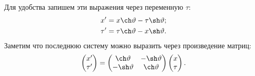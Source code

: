 Для удобства запишем эти выражения через переменную $\tau$:
\begin{align*}
x^{\prime} & =x \ch \vartheta-\tau \sh \vartheta; \\
\tau^{\prime} & =\tau \ch \vartheta-x \sh \vartheta.
\end{align*}
Заметим что последнюю систему можно выразить через произведение матриц:
\begin{equation}
	\begin{pmatrix}
		x' \\
		\tau'
	\end{pmatrix} = 
	\begin{pmatrix}
		\ch \vartheta & -\sh \vartheta \\
		-\sh \vartheta & \ch \vartheta \\ 
	\end{pmatrix}
	\begin{pmatrix}
		x \\
		\tau
	\end{pmatrix}.
\end{equation}